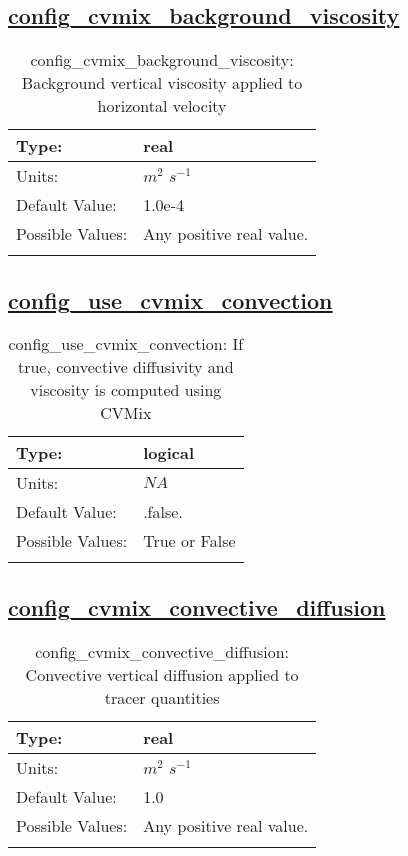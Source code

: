 \subsection[config\_cvmix\_background\_viscosity]{\hyperref[sec:nm_tab_cvmix]{config\_cvmix\_background\_viscosity}}
\label{subsec:nm_sec_config_cvmix_background_viscosity}
\begin{center}
\begin{longtable}{| p{2.0in} || p{4.0in} |}
    \hline
    Type: & real \\
    \hline
    Units: & $m^2$ $s^{-1}$ \\
    \hline
    Default Value: & 1.0e-4 \\
    \hline
    Possible Values: & Any positive real value. \\
    \hline
    \caption{config\_cvmix\_background\_viscosity: Background vertical viscosity applied to horizontal velocity}
\end{longtable}
\end{center}
\subsection[config\_use\_cvmix\_convection]{\hyperref[sec:nm_tab_cvmix]{config\_use\_cvmix\_convection}}
\label{subsec:nm_sec_config_use_cvmix_convection}
\begin{center}
\begin{longtable}{| p{2.0in} || p{4.0in} |}
    \hline
    Type: & logical \\
    \hline
    Units: & $NA$ \\
    \hline
    Default Value: & .false. \\
    \hline
    Possible Values: & True or False \\
    \hline
    \caption{config\_use\_cvmix\_convection: If true, convective diffusivity and viscosity is computed using CVMix}
\end{longtable}
\end{center}
\subsection[config\_cvmix\_convective\_diffusion]{\hyperref[sec:nm_tab_cvmix]{config\_cvmix\_convective\_diffusion}}
\label{subsec:nm_sec_config_cvmix_convective_diffusion}
\begin{center}
\begin{longtable}{| p{2.0in} || p{4.0in} |}
    \hline
    Type: & real \\
    \hline
    Units: & $m^2$ $s^{-1}$ \\
    \hline
    Default Value: & 1.0 \\
    \hline
    Possible Values: & Any positive real value. \\
    \hline
    \caption{config\_cvmix\_convective\_diffusion: Convective vertical diffusion applied to tracer quantities}
\end{longtable}
\end{center}
